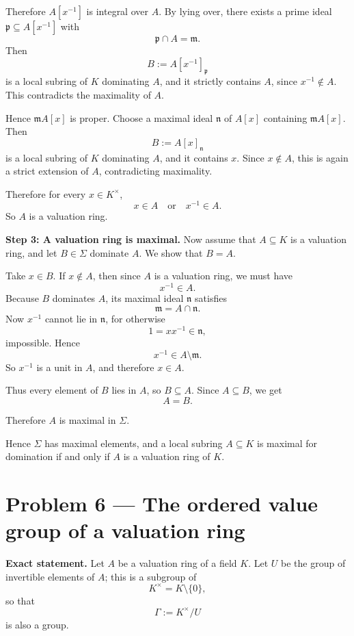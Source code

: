 \documentclass[12pt,a4paper]{article}
\theoremstyle{plain}
\theoremstyle{definition}      %
\begin{document}
Therefore \(A[x^{-1}]\) is integral over \(A\). By lying over, there exists a prime ideal \(\mathfrak p\subseteq A[x^{-1}]\) with
\[
\mathfrak p\cap A=\mathfrak m.
\]
Then
\[
B:=A[x^{-1}]_{\mathfrak p}
\]
is a local subring of \(K\) dominating \(A\), and it strictly contains \(A\), since \(x^{-1}\notin A\). This contradicts the maximality of \(A\).

Hence \(\mathfrak m A[x]\) is proper. Choose a maximal ideal \(\mathfrak n\) of \(A[x]\) containing \(\mathfrak m A[x]\). Then
\[
B:=A[x]_{\mathfrak n}
\]
is a local subring of \(K\) dominating \(A\), and it contains \(x\). Since \(x\notin A\), this is again a strict extension of \(A\), contradicting maximality.

Therefore for every \(x\in K^\times\),
\[
x\in A \quad\text{or}\quad x^{-1}\in A.
\]
So \(A\) is a valuation ring.

\medskip

\textbf{Step 3: A valuation ring is maximal.}
Now assume that \(A\subseteq K\) is a valuation ring, and let \(B\in\Sigma\) dominate \(A\). We show that \(B=A\).

Take \(x\in B\). If \(x\notin A\), then since \(A\) is a valuation ring, we must have
\[
x^{-1}\in A.
\]
Because \(B\) dominates \(A\), its maximal ideal \(\mathfrak n\) satisfies
\[
\mathfrak m=A\cap \mathfrak n.
\]
Now \(x^{-1}\) cannot lie in \(\mathfrak n\), for otherwise
\[
1=xx^{-1}\in \mathfrak n,
\]
impossible. Hence
\[
x^{-1}\in A\setminus \mathfrak m.
\]
So \(x^{-1}\) is a unit in \(A\), and therefore \(x\in A\).

Thus every element of \(B\) lies in \(A\), so \(B\subseteq A\). Since \(A\subseteq B\), we get
\[
A=B.
\]

Therefore \(A\) is maximal in \(\Sigma\).

\medskip

Hence \(\Sigma\) has maximal elements, and a local subring \(A\subseteq K\) is maximal for domination if and only if \(A\) is a valuation ring of \(K\).

\section*{Problem 6 --- The ordered value group of a valuation ring}

\textbf{Exact statement.}
Let \(A\) be a valuation ring of a field \(K\). Let \(U\) be the group of invertible elements of \(A\); this is a subgroup of
\[
K^\times=K\setminus\{0\},
\]
so that
\[
\Gamma:=K^\times/U
\]
is also a group.
\end{document}

